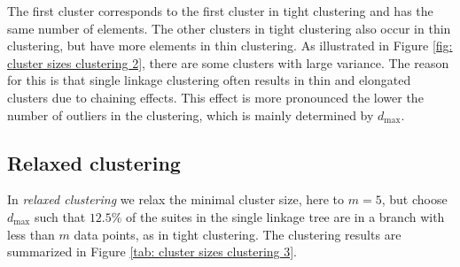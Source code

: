 \documentclass{llncs}
\begin{document}
The first cluster corresponds to the first cluster in tight clustering and has the same number of elements. The other clusters in tight clustering also occur in thin clustering, but have more elements in thin clustering. As illustrated in Figure \ref{fig: cluster sizes clustering 2}, there are some clusters with large variance. The reason for this is that single linkage clustering often results in thin and elongated clusters due to chaining effects. This effect is more pronounced the lower the number of outliers in the clustering, which is mainly determined by $d_{\text{max}}$.

\subsection{Relaxed clustering}
\label{seq: multi mode clustering}
In \emph{relaxed clustering} we relax the minimal cluster size, here to $m=5$, but choose $d_{\text{max}}$ such that $12.5\%$ of the suites in the single linkage tree are in a branch with less than $m$ data points, as in tight clustering.
The clustering results are summarized in Figure \ref{tab: cluster sizes clustering 3}.
\end{document}
